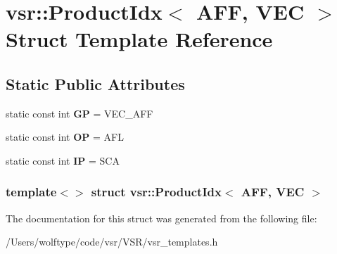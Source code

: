 \hypertarget{structvsr_1_1_product_idx_3_01_a_f_f_00_01_v_e_c_01_4}{\section{vsr\-:\-:Product\-Idx$<$ A\-F\-F, V\-E\-C $>$ Struct Template Reference}
\label{structvsr_1_1_product_idx_3_01_a_f_f_00_01_v_e_c_01_4}
}
\subsection*{Static Public Attributes}
\begin{DoxyCompactItemize}
\item 
\hypertarget{structvsr_1_1_product_idx_3_01_a_f_f_00_01_v_e_c_01_4_a1eeec4dc0906662292c92c11b4d3e786}{static const int {\bfseries G\-P} = V\-E\-C\-\_\-\-A\-F\-F}\label{structvsr_1_1_product_idx_3_01_a_f_f_00_01_v_e_c_01_4_a1eeec4dc0906662292c92c11b4d3e786}

\item 
\hypertarget{structvsr_1_1_product_idx_3_01_a_f_f_00_01_v_e_c_01_4_a27e5e14798c6176eaa9f9bca6eb526ab}{static const int {\bfseries O\-P} = A\-F\-L}\label{structvsr_1_1_product_idx_3_01_a_f_f_00_01_v_e_c_01_4_a27e5e14798c6176eaa9f9bca6eb526ab}

\item 
\hypertarget{structvsr_1_1_product_idx_3_01_a_f_f_00_01_v_e_c_01_4_ae691b6e9e3ca3f62eafe1760b140771f}{static const int {\bfseries I\-P} = S\-C\-A}\label{structvsr_1_1_product_idx_3_01_a_f_f_00_01_v_e_c_01_4_ae691b6e9e3ca3f62eafe1760b140771f}

\end{DoxyCompactItemize}
\subsubsection*{template$<$$>$ struct vsr\-::\-Product\-Idx$<$ A\-F\-F, V\-E\-C $>$}



The documentation for this struct was generated from the following file\-:\begin{DoxyCompactItemize}
\item 
/\-Users/wolftype/code/vsr/\-V\-S\-R/vsr\-\_\-templates.\-h\end{DoxyCompactItemize}
